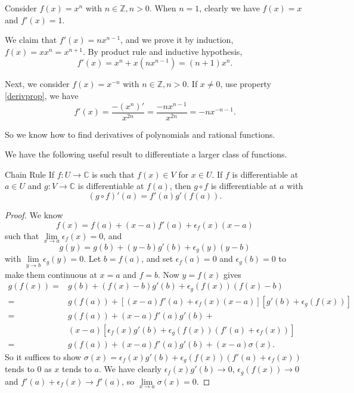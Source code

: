 \begin{example}
    Consider \(f(x) = x^{n}\) with \(n \in \mathbb{Z}, n>0\). When \(n = 1\), clearly we have \(f(x) = x\) and \(f'(x) = 1\).

    We claim that \(f'(x) = nx^{n-1}\), and we prove it by induction, \(f(x) = x x^n = x^{n + 1}\). By product rule and inductive hypothesis,
    \[
        f'(x) = x^n + x(nx^{n-1}) = (n + 1) x^n.
    \]

    Next, we consider \(f(x) = x^{-n}\) with \(n \in \mathbb{Z}, n > 0\). If \(x \neq 0\), use property \ref{derivprop}, we have
    \[
        f'(x) = \frac{-(x^n)'}{x^{2n}} = \frac{-nx^{n-1}}{x^{2n}} = -n x^{-n -1}.
    \]

    So we know how to find derivatives of polynomials and rational functions.
\end{example}
We have the following useful result to differentiate a larger class of functions.
\begin{theorem}{Chain Rule}{}
    If \(f: U \to \mathbb{C}\) is such that \(f(x) \in V\) for \(x \in U\). If \(f\) is differentiable at \(a \in U\) and \(g:V \to \mathbb{C}\) is differentiable at \(f(a)\), then \(g\circ f\) is differentiable at \(a\) with
    \[
        (g\circ f)'(a) = f'(a)g'(f(a)).
    \]
\end{theorem}
\begin{proof}
    We know
    \[
        f(x) = f(a) + (x-a)f'(a) + \epsilon_f(x)(x-a)
    \]
    such that \(\lim\limits_{x \to a} \epsilon_f(x)= 0\), and
    \[
        g(y) = g(b) + (y - b)g'(b) + \epsilon_g(y)(y-b)
    \]
    with \(\lim\limits_{y \to b} \epsilon_g(y) = 0\). Let \(b = f(a)\), and set \(\epsilon_f(a) = 0\) and \(\epsilon_g(b) = 0\) to make them continuous at \(x = a\) and \(f = b\). Now \(y = f(x)\) gives
    \begin{align*}
        g(f(x)) =& g(b) + (f(x) - b)g'(b) + \epsilon_g(f(x))(f(x) - b)\\
        =&g(f(a)) + [(x-a)f'(a) + \epsilon_f(x)(x-a)][g'(b) + \epsilon_g(f(x))]\\
        =& g(f(a)) + (x-a)f'(a)g'(b) +\\
        &(x-a)[\epsilon_f(x)g'(b) + \epsilon_g(f(x))(f'(a) + \epsilon_f(x))]\\
        =& g(f(a)) + (x-a)f'(a)g'(b) + (x-a)\sigma(x).
    \end{align*}
    So it suffices to show \(\sigma(x) = \epsilon_f(x)g'(b) + \epsilon_g(f(x))(f'(a) + \epsilon_f(x))\) tends to 0 as \(x\) tends to \(a\). We have clearly \(\epsilon_f(x)g'(b) \to 0\), \(\epsilon_g(f(x)) \to 0\) and \(f'(a)+\epsilon_f(x) \to f'(a)\), so \(\lim\limits_{x \to a} \sigma(x) = 0\).
\end{proof}
